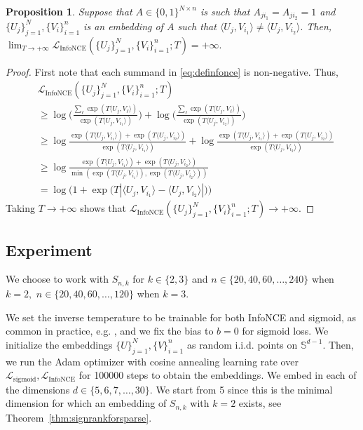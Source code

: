 \documentclass[preprint]{article}
\newtheorem{proposition}{Proposition}[]
\newcommand{\sigloss}{\mathcal{L}_{\text{sigmoid}}}
\newcommand{\infonceloss}{\mathcal{L}_{\text{InfoNCE}}}
\newcommand{\ksparsen}{S_{n,k}}
\begin{document}
\begin{proposition}
    Suppose that $A\in \{0,1\}^{N\times n}$ is such that $A_{ji_1} = A_{ji_2} = 1$ and $\{U_j\}_{j = 1}^N, \{V_i\}_{i = 1}^n$ is an embedding of $A$ such that $\langle U_j,V_{i_1}\rangle \neq  \langle U_j,V_{i_2}\rangle.$ Then, 
    $\lim_{T\longrightarrow + \infty}
    \infonceloss(\{U_j\}_{j = 1}^N, \{V_i\}_{i = 1}^n; T) = +\infty.
    $
\end{proposition}
\begin{proof} First note that each summand in \eqref{eq:definfonce} is non-negative. Thus,
\begin{align*}
    & \infonceloss(\{U_j\}_{j = 1}^N, \{V_i\}_{i = 1}^n; T)\\
    & \ge \log\Big(
\frac{\sum_\ell \exp(T\langle U_j, V_\ell\rangle)}{\exp(T\langle U_j, V_{i_1}\rangle)}
\Big)+
\log\Big(
\frac{\sum_\ell \exp(T\langle U_j, V_\ell\rangle)}{\exp(T\langle U_j, V_{i_2}\rangle)}
\Big)\\
& \ge \log
\frac{\exp(T\langle U_j, V_{i_1}\rangle) + \exp(T\langle U_j, V_{i_2} \rangle)}{\exp(T\langle U_j, V_{i_1}\rangle)} + 
\log
\frac{\exp(T\langle U_j, V_{i_1}\rangle) + \exp(T\langle U_j, V_{i_2} \rangle)}{\exp(T\langle U_j, V_{i_2}\rangle)}\\
& \ge 
\log
\frac{\exp(T\langle U_j, V_{i_1}\rangle) + \exp(T\langle U_j, V_{i_2} \rangle)}{\min(\exp(T\langle U_j, V_{i_1}\rangle),\exp(T\langle U_j, V_{i_2}\rangle)) }\\
& = 
\log\bigg(1 + \exp\Big(T |\langle U_j, V_{i_1}\rangle - 
\langle U_j, V_{i_2}\rangle|\Big)\bigg)
\end{align*}
Taking $T\longrightarrow +\infty$ shows that
$\infonceloss(\{U_j\}_{j = 1}^N, \{V_i\}_{i = 1}^n; T)\longrightarrow + \infty.$
\end{proof}


\subsection{Experiment}
We choose to work with $\ksparsen$ for $k \in \{2,3\}$ and 
$n \in \{20,40,60,\ldots, 240\}$ when $k = 2, $
$n \in \{20,40,60,\ldots, 120\}$ when $k = 3.$

We set the inverse temperature to be trainable for both InfoNCE and sigmoid, as common in practice, e.g. \cite{zhai23siglip}, and we fix the bias to $b=0$ for sigmoid loss. We initialize the embeddings $\{U\}_{j = 1}^N,\{V\}_{i = 1}^n$ as random i.i.d. points on $\mathbb{S}^{d-1}.$ Then, we run the Adam optimizer with cosine annealing learning rate over $\sigloss, \infonceloss$ for 100000 steps to obtain the embeddings. We embed in each of the dimensions $d\in \{5,6,7,\ldots, 30\}.$ We start from 5 since this is the minimal dimension for which an embedding of $\ksparsen$ with $k = 2$ exists, see Theorem~\ref{thm:signrankforsparse}.
\end{document}
